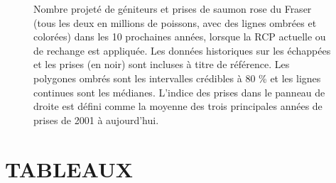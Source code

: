 \documentclass[french,11pt]{book}
\begin{document}
\begin{figure}[htb]

{\centering {} 

}

\caption{Nombre projeté de géniteurs et prises de saumon rose du Fraser (tous les deux en millions de poissons, avec des lignes ombrées et colorées) dans les 10 prochaines années, lorsque la RCP actuelle ou de rechange est appliquée. Les données historiques sur les échappées et les prises (en noir) sont incluses à titre de référence. Les polygones ombrés sont les intervalles crédibles à 80 \% et les lignes continues sont les médianes. L'indice des prises dans le panneau de droite est défini comme la moyenne des trois principales années de prises de 2001 à aujourd'hui.}\label{fig:fig-fwd-SC}
\end{figure}
\clearpage

\hypertarget{tableaux}{%
\section{TABLEAUX}\label{tableaux}}
\end{document}
